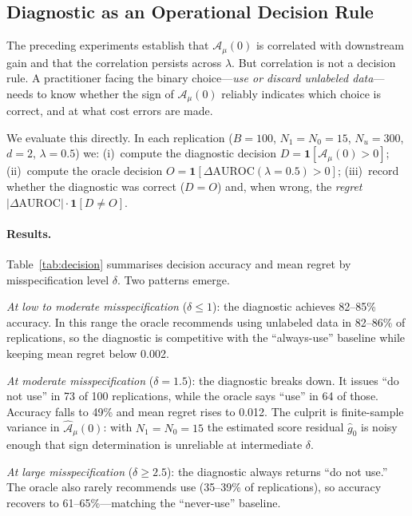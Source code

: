 \documentclass[11pt]{article}
\theoremstyle{definition}
\newcommand{\lam}{\lambda}
\newcommand{\calA}{\mathcal{A}}
\begin{document}
\subsection{Diagnostic as an Operational Decision Rule}
\label{sec:sim-decision}

The preceding experiments establish that \(\calA_\mu(0)\) is correlated with
downstream gain and that the correlation persists across \(\lam\).
But correlation is not a decision rule.
A practitioner facing the binary choice---\emph{use or discard unlabeled
data}---needs to know whether the sign of \(\calA_\mu(0)\) reliably indicates
which choice is correct, and at what cost errors are made.

We evaluate this directly.
In each replication (\(B=100\), \(N_1=N_0=15\), \(N_u=300\), \(d=2\),
\(\lam=0.5\)) we:
(i)~compute the diagnostic decision
\(D = \mathbf{1}\!\left[\calA_\mu(0) > 0\right]\);
(ii)~compute the oracle decision
\(O = \mathbf{1}\!\left[\Delta\mathrm{AUROC}(\lam{=}0.5) > 0\right]\);
(iii)~record whether the diagnostic was correct (\(D=O\))
and, when wrong, the \emph{regret} \(|\Delta\mathrm{AUROC}|\cdot\mathbf{1}[D\neq O]\).

\paragraph{Results.}
Table~\ref{tab:decision} summarises decision accuracy and mean regret
by misspecification level \(\delta\).
Two patterns emerge.

\emph{At low to moderate misspecification} (\(\delta \le 1\)):
the diagnostic achieves 82--85\% accuracy.
In this range the oracle recommends using unlabeled data in 82--86\% of
replications, so the diagnostic is competitive with the ``always-use'' baseline
while keeping mean regret below 0.002.

\emph{At moderate misspecification} (\(\delta = 1.5\)):
the diagnostic breaks down.
It issues ``do not use'' in 73 of 100 replications, while the oracle says
``use'' in 64 of those.
Accuracy falls to 49\% and mean regret rises to 0.012.
The culprit is finite-sample variance in \(\hat{\calA}_\mu(0)\):
with \(N_1=N_0=15\) the estimated score residual \(\hat{g}_0\) is noisy enough
that sign determination is unreliable at intermediate \(\delta\).

\emph{At large misspecification} (\(\delta \ge 2.5\)):
the diagnostic always returns ``do not use.''
The oracle also rarely recommends use (35--39\% of replications),
so accuracy recovers to 61--65\%---matching the ``never-use'' baseline.
\end{document}
